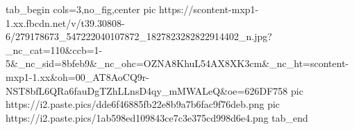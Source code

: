 
 
 
 
 

\ifcmt
  tab_begin cols=3,no_fig,center
     pic https://scontent-mxp1-1.xx.fbcdn.net/v/t39.30808-6/279178673_547222040107872_1827823282822914402_n.jpg?_nc_cat=110&ccb=1-5&_nc_sid=8bfeb9&_nc_ohc=OZNA8KhuL54AX8XK3cm&_nc_ht=scontent-mxp1-1.xx&oh=00_AT8AoCQ9r-NST8bfL6QRa6fauDgTZhLLnsD4qy_mMWALeQ&oe=626DF758
		 pic https://i2.paste.pics/dde6f46885fb22e8b9a7b6fac9f76deb.png
		 pic https://i2.paste.pics/1ab598ed109843ce7c3e375cd998d6e4.png
  tab_end
\fi
